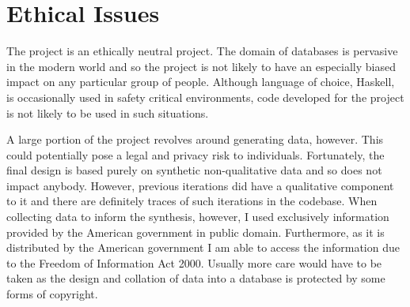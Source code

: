 \chapter*{Ethical Issues}
\begin{comment}
You are required to include a short discussion of ethical, legal, societal and professional issues that are relevant to your project (usually 1 to 2 pages long). This should fit in the most appropriate section of your project report, often the Background or Conclusions section.
\end{comment}
The project is an ethically neutral project. The domain of databases is
pervasive in the modern world and so the project is not likely to have an
especially biased impact on any particular group of people. Although language of
choice, Haskell, is occasionally used in safety critical environments, code
developed for the project is not likely to be used in such situations.

A large portion of the project revolves around generating data, however. This
could potentially pose a legal and privacy risk to individuals. Fortunately, the
final design is based purely on synthetic non-qualitative data and so does not
impact anybody. However, previous iterations did have a qualitative component to
it and there are definitely traces of such iterations in the codebase. When
collecting data to inform the synthesis, however, I used exclusively
information provided by the American government in public domain. Furthermore,
as it is distributed by the American government I am able to access the
information due to the Freedom of Information Act 2000. Usually more care would
have to be taken as the design and collation of data into a database is
protected by some forms of copyright.
